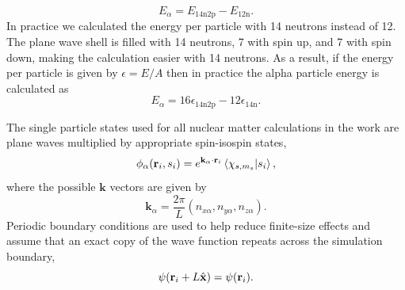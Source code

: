 \begin{equation}
   E_\alpha = E_\text{14n2p} - E_\text{12n}.
\end{equation}
In practice we calculated the energy per particle with 14 neutrons instead of 12. The plane wave shell is filled with 14 neutrons, 7 with spin up, and 7 with spin down, making the calculation easier with 14 neutrons. As a result, if the energy per particle is given by $\epsilon = E/A$ then in practice the alpha particle energy is calculated as
\begin{equation}
   E_\alpha = 16\epsilon_\text{14n2p} - 12\epsilon_\text{14n}.
   \label{equ:alphaenergy14n2p}
\end{equation}

The single particle states used for all nuclear matter calculations in the work are plane waves multiplied by appropriate spin-isospin states,
\begin{equation}
   \phi_\alpha(\mathbf{r}_i,s_i) = e^{\mathbf{k}_\alpha\cdot\mathbf{r}_i}\left< \chi_{s,m_s} | s_i \right>,
\end{equation}
where the possible $\mathbf{k}$ vectors are given by
\begin{equation}
   \mathbf{k}_\alpha = \frac{2\pi}{L}(n_{x\alpha},n_{y\alpha},n_{z\alpha}).
\end{equation}
Periodic boundary conditions are used to help reduce finite-size effects and assume that an exact copy of the wave function repeats across the simulation boundary,
\begin{equation}
   \psi(\mathbf{r}_i+L\hat{\mathbf{x}}) = \psi(\mathbf{r}_i).
\end{equation}

